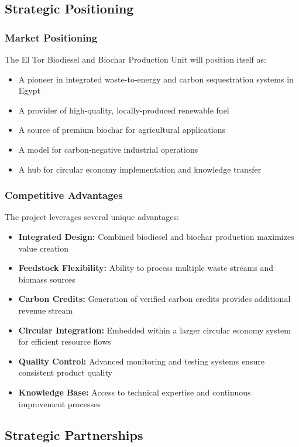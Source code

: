 \subsection{Strategic Positioning}

\subsubsection{Market Positioning}
The El Tor Biodiesel and Biochar Production Unit will position itself as:

\begin{itemize}
    \item A pioneer in integrated waste-to-energy and carbon sequestration systems in Egypt
    \item A provider of high-quality, locally-produced renewable fuel
    \item A source of premium biochar for agricultural applications
    \item A model for carbon-negative industrial operations
    \item A hub for circular economy implementation and knowledge transfer
\end{itemize}

\subsubsection{Competitive Advantages}
The project leverages several unique advantages:

\begin{itemize}
    \item \textbf{Integrated Design:} Combined biodiesel and biochar production maximizes value creation
    \item \textbf{Feedstock Flexibility:} Ability to process multiple waste streams and biomass sources
    \item \textbf{Carbon Credits:} Generation of verified carbon credits provides additional revenue stream
    \item \textbf{Circular Integration:} Embedded within a larger circular economy system for efficient resource flows
    \item \textbf{Quality Control:} Advanced monitoring and testing systems ensure consistent product quality
    \item \textbf{Knowledge Base:} Access to technical expertise and continuous improvement processes
\end{itemize}

\subsection{Strategic Partnerships}

